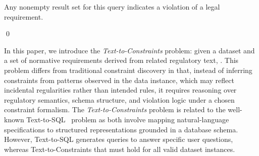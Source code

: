 \begin{example}
Any nonempty result set for this query indicates a violation of a legal requirement.

\qed
\end{example}




In this paper, we introduce the \emph{Text-to-Constraints} problem: given a dataset and a set of normative requirements derived from related regulatory text, .  This problem differs from traditional constraint discovery in that, instead of inferring constraints from patterns observed in the data instance, which may reflect incidental regularities rather than intended rules, it requires reasoning over regulatory semantics, schema structure, and violation logic under a chosen constraint formalism. The \emph{Text-to-Constraints} problem is related to the well-known Text-to-SQL~\cite{llmTEXT2SQLSurvey2025} problem as both involve mapping natural-language specifications to structured representations grounded in a database schema. However, Text-to-SQL generates queries to answer specific user questions,  whereas Text-to-Constraints  that must hold for all valid dataset instances.  %

